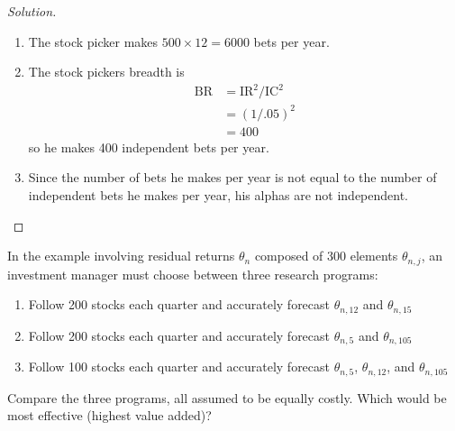 \begin{proof}[Solution]
 \quad\newline
 \begin{enumerate}[label=(\alph*)]
   \item{The stock picker makes $500\times12=6000$ bets per year.}
   \item{The stock pickers breadth is 
   \begin{align*}
    \mathrm{BR}&=\mathrm{IR}^{2}/\mathrm{IC}^{2}\\
	       &=(1/.05)^{2}\\
	       &=400
   \end{align*}
    so he makes 400 independent bets per year.}
    \item{Since the number of bets he makes per year is not equal to the number of independent bets he makes per year, his alphas are not independent.}
 \end{enumerate}
\end{proof}

\begin{problem}{6.3}
 In the example involving residual returns $\theta_{n}$ composed of 300 elements $\theta_{n,j}$, an investment manager must choose between three research programs:
 \begin{enumerate}[label=(\alph*)]
   \item{Follow 200 stocks each quarter and accurately forecast $\theta_{n,12}$ and $\theta_{n,15}$}
   \item{Follow 200 stocks each quarter and accurately forecast $\theta_{n,5}$ and $\theta_{n,105}$}
   \item{Follow 100 stocks each quarter and accurately forecast $\theta_{n,5}$, $\theta_{n,12}$, and $\theta_{n,105}$}
 \end{enumerate}
 Compare the three programs, all assumed to be equally costly. Which would be most effective (highest value added)?  
\end{problem}

